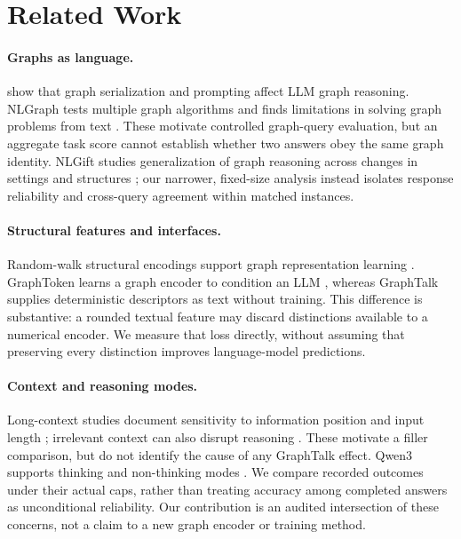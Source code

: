 \documentclass[11pt]{article}
\begin{document}
\section{Related Work}
\paragraph{Graphs as language.}
\citet{fatemi2024talk} show that graph serialization and prompting affect LLM graph reasoning. NLGraph tests multiple graph algorithms and finds limitations in solving graph problems from text \citep{wang2023nlgraph}. These motivate controlled graph-query evaluation, but an aggregate task score cannot establish whether two answers obey the same graph identity. NLGift studies generalization of graph reasoning across changes in settings and structures \citep{zhang2024nlgift}; our narrower, fixed-size analysis instead isolates response reliability and cross-query agreement within matched instances.

\paragraph{Structural features and interfaces.}
Random-walk structural encodings support graph representation learning \citep{dwivedi2022lspe}. GraphToken learns a graph encoder to condition an LLM \citep{perozzi2024graphtoken}, whereas GraphTalk supplies deterministic descriptors as text without training. This difference is substantive: a rounded textual feature may discard distinctions available to a numerical encoder. We measure that loss directly, without assuming that preserving every distinction improves language-model predictions.

\paragraph{Context and reasoning modes.}
Long-context studies document sensitivity to information position and input length \citep{liu2024lost,levy2024same}; irrelevant context can also disrupt reasoning \citep{shi2023distracted}. These motivate a filler comparison, but do not identify the cause of any GraphTalk effect. Qwen3 supports thinking and non-thinking modes \citep{yang2025qwen3}. We compare recorded outcomes under their actual caps, rather than treating accuracy among completed answers as unconditional reliability. Our contribution is an audited intersection of these concerns, not a claim to a new graph encoder or training method.
\end{document}
